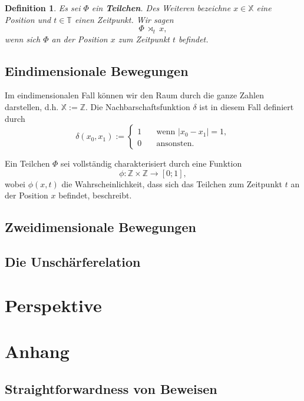 \documentclass[a4paper,12pt,ngerman]{scrartcl}
\theoremstyle{plain}
\newtheorem{definition}{Definition}
\theoremstyle{plain}
\newcommand{\Z}{\mathbb{Z}}
\newcommand{\T}{\mathbb{T}}
\newcommand{\X}{\mathbb{X}}
\begin{document}

\begin{definition}
Es sei $\Phi$ ein \textbf{Teilchen}. Des Weiteren bezeichne $x\in\X$ eine Position und $t\in\T$ einen Zeitpunkt. Wir sagen
\[\Phi \;\rtimes_t\; x,\]
wenn sich $\Phi$ an der Position $x$ zum Zeitpunkt $t$ befindet.
\end{definition}

\subsection{Eindimensionale Bewegungen}

Im eindimensionalen Fall können wir den Raum durch die ganze Zahlen darstellen, d.h. $\X := \Z$. Die Nachbarschaftsfunktion $\delta$ ist in diesem Fall definiert durch 
\[\delta(x_0,x_1):=\begin{cases}
1 \quad&\mbox{wenn } |x_0-x_1|=1,\\
0 \quad&\mbox{ansonsten.}
\end{cases}\]



Ein Teilchen $\Phi$ sei vollständig charakterisiert durch eine Funktion \[\phi: \Z \times \Z \rightarrow [ 0;1],\]
wobei $\phi(x,t)$ die Wahrscheinlichkeit, dass sich das Teilchen zum Zeitpunkt $t$ an der Position $x$ befindet, beschreibt.

\subsection{Zweidimensionale Bewegungen}

\subsection{Die Unschärferelation}

\section{Perspektive}

\section{Anhang}

\subsection{Straightforwardness von Beweisen}
\end{document}
